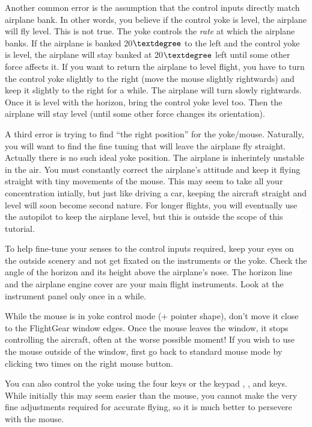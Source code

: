 Another common error is the assumption that the control inputs directly
match airplane bank. In other words, you believe if the control yoke is
level, the airplane will fly level. This is not true. The yoke
controls the \emph{rate} at which the airplane banks. If the airplane is
banked 20$\textdegree$ to the left and the control yoke is level, the
airplane will stay banked at 20$\textdegree$ left until some other force
affects it. If you want to return the airplane to level flight, you have to
turn the control yoke slightly to the right (move the mouse slightly
rightwards) and keep it slightly to the right for a while. The airplane
will turn slowly rightwards. Once it is level with the horizon, bring the
control yoke level too. Then the airplane will stay level (until some other
force changes its orientation).

A third error is trying to find ``the right position'' for the
yoke/mouse. Naturally, you will want to find the fine tuning that will leave 
the airplane fly straight. Actually there is no such ideal yoke
position. The airplane is inherintely unstable in the air. You must constantly 
correct the airplane's attitude and keep it flying straight with tiny movements
of the mouse. This may seem to take all your concentration intially,
but just like driving a car, keeping the aircraft straight and level will soon
become second nature. For longer flights, you will eventually use the autopilot
to keep the airplane level, but this is outside the scope of this tutorial. 

To help fine-tune your senses to the control inputs required, keep your eyes on 
the outside scenery and not get fixated on the instruments or the yoke. Check 
the angle of the horizon and its height above the airplane's nose. The horizon 
line and the airplane engine cover are your main flight instruments. Look at
the instrument panel only once in a while.

While the mouse is in yoke control mode
($+$ pointer shape), don't move it close to the FlightGear window
edges. Once the mouse leaves the window, it stops controlling the aircraft,
often at the worse possible moment!
If you wish to use the mouse outside of the window, first go back to standard 
mouse mode by clicking two times on the right mouse button.

You can also control the yoke using the four  keys
or the keypad , ,  and  keys. While initially this
may seem easier than the mouse, you cannot make the very fine adjustments
required for accurate flying, so it is much better to persevere with the mouse.

